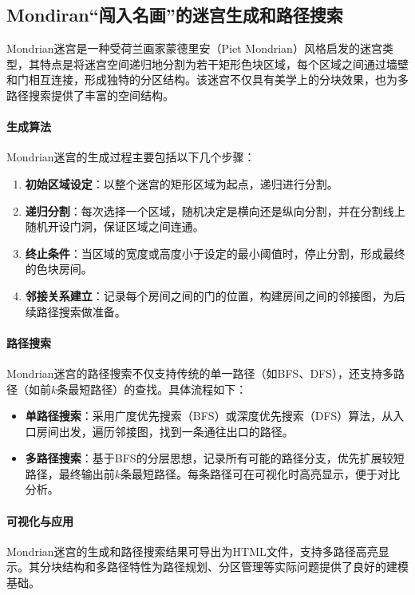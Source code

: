 \documentclass[UTF8]{ctexart}
\begin{document}
\subsection{Mondiran“闯入名画”的迷宫生成和路径搜索}

Mondrian迷宫是一种受荷兰画家蒙德里安（Piet Mondrian）风格启发的迷宫类型，其特点是将迷宫空间递归地分割为若干矩形色块区域，每个区域之间通过墙壁和门相互连接，形成独特的分区结构。该迷宫不仅具有美学上的分块效果，也为多路径搜索提供了丰富的空间结构。

\paragraph{生成算法}
Mondrian迷宫的生成过程主要包括以下几个步骤：
\begin{enumerate}
    \item \textbf{初始区域设定}：以整个迷宫的矩形区域为起点，递归进行分割。
    \item \textbf{递归分割}：每次选择一个区域，随机决定是横向还是纵向分割，并在分割线上随机开设门洞，保证区域之间连通。
    \item \textbf{终止条件}：当区域的宽度或高度小于设定的最小阈值时，停止分割，形成最终的色块房间。
    \item \textbf{邻接关系建立}：记录每个房间之间的门的位置，构建房间之间的邻接图，为后续路径搜索做准备。
\end{enumerate}

\paragraph{路径搜索}
Mondrian迷宫的路径搜索不仅支持传统的单一路径（如BFS、DFS），还支持多路径（如前$k$条最短路径）的查找。具体流程如下：
\begin{itemize}
    \item \textbf{单路径搜索}：采用广度优先搜索（BFS）或深度优先搜索（DFS）算法，从入口房间出发，遍历邻接图，找到一条通往出口的路径。
    \item \textbf{多路径搜索}：基于BFS的分层思想，记录所有可能的路径分支，优先扩展较短路径，最终输出前$k$条最短路径。每条路径可在可视化时高亮显示，便于对比分析。
\end{itemize}

\paragraph{可视化与应用}
Mondrian迷宫的生成和路径搜索结果可导出为HTML文件，支持多路径高亮显示。其分块结构和多路径特性为路径规划、分区管理等实际问题提供了良好的建模基础。
\end{document}

